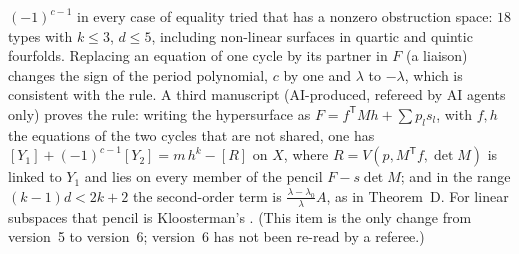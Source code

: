\documentclass[10pt]{article}
\numberwithin{equation}{section}
\theoremstyle{remark}
\begin{document}
\begin{enumerate}[label=\textup{\arabic*.}]
$(-1)^{c-1}$ in every case of equality tried that has a nonzero obstruction space: $18$ types with $k\le3$,
$d\le5$, including non-linear surfaces in quartic and quintic fourfolds. Replacing an equation of one cycle by its
partner in $F$ (a liaison) changes the sign of the period polynomial, $c$ by one and $\lambda$ to $-\lambda$,
which is consistent with the rule. A third manuscript \cite{P3} (AI-produced, refereed by AI agents only)
proves the rule: writing the hypersurface as $F=f^{\mathsf T}Mh+\sum p_ls_l$, with $f,h$ the equations of the two
cycles that are not shared, one has $[Y_1]+(-1)^{c-1}[Y_2]=m\,h^k-[R]$ on $X$, where $R=V(p,M^{\mathsf T}f,\det M)$ is
linked to $Y_1$ and lies on every member of the pencil $F-s\det M$; and in the range $(k-1)d<2k+2$ the
second-order term is $\frac{\lambda-\lambda_0}{\lambda}A$, as in Theorem~D. For linear subspaces that pencil is
Kloosterman's \cite[\S6]{Kl1}. (This item is the only change from version~5 to version~6; version~6 has not been
re-read by a referee.)
\end{enumerate}
\end{document}
